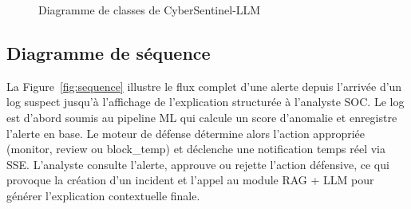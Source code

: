 \documentclass[12pt,a4paper]{report}
\begin{document}
\begin{figure}[H]
{
}
\caption{Diagramme de classes de CyberSentinel-LLM}
\label{fig:classes}
\end{figure}

\subsection{Diagramme de séquence}
\begin{onehalfspace}
La Figure~\ref{fig:sequence} illustre le flux complet d'une alerte depuis l'arrivée d'un log suspect jusqu'à l'affichage de l'explication structurée à l'analyste SOC. Le log est d'abord soumis au pipeline ML qui calcule un score d'anomalie et enregistre l'alerte en base. Le moteur de défense détermine alors l'action appropriée (monitor, review ou block\_temp) et déclenche une notification temps réel via SSE. L'analyste consulte l'alerte, approuve ou rejette l'action défensive, ce qui provoque la création d'un incident et l'appel au module RAG + LLM pour générer l'explication contextuelle finale.
\end{onehalfspace}
\end{document}
